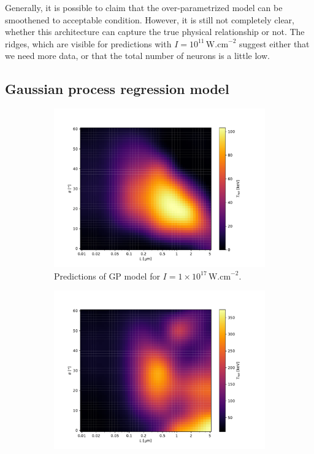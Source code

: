 Generally, it is possible to claim that the over-parametrized model can be smoothened to acceptable condition. However, it is still not completely clear, whether this architecture can capture the true physical relationship or not. The ridges, which are visible for predictions with $I = 10^{11} \, \mathrm{W.cm}^{-2}$ suggest either that we need more data, or that the total number of neurons is a little low.


\subsection*{Gaussian process regression model}

\begin{figure}[ht]
	\centering
	\begin{subfigure}{0.49\textwidth}
		\centering
		\includegraphics[width=\textwidth]{figures/gp17_pred}
		\caption{Predictions of GP model for $I = 1 \times 10^{17} \, \mathrm{W.cm}^{-2}$.}
		\label{fig:gp-pred-a}
	\end{subfigure}
	\hfill
	\begin{subfigure}{0.49\textwidth}
		\centering
		\includegraphics[width=\textwidth]{figures/gp18_pred}

\end{subfigure}
\end{figure}
